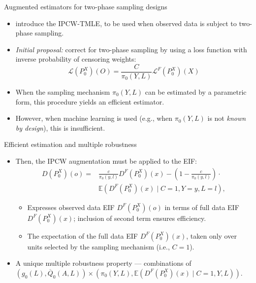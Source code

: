 \documentclass{beamer}
\newcommand{\E}{\mathbb{E}}
\newcommand{\lik}{\mathcal{L}}
\begin{document}

\begin{frame}[c]{Augmented estimators for two-phase sampling designs}

\begin{center}
\begin{itemize}
  \itemsep10pt
  \item \cite{rose2011targeted2sd} introduce the IPCW-TMLE, to be used when
    observed data is subject to two-phase sampling.
  \item \textit{Initial proposal:} correct for two-phase sampling by using a
    loss function with inverse probability of censoring weights:
    \begin{equation*}
      \lik(P_0^X)(O) = \frac{C}{\pi_0(Y, L)}\lik^F(P_0^X)(X)
    \end{equation*}
  \item When the sampling mechanism $\pi_0(Y,L)$ can be estimated by
    a parametric form, this procedure yields an efficient estimator.
  \item However, when machine learning is used (e.g., when $\pi_0(Y,L)$ is not
    \textit{known by design}), this is insufficient.
\end{itemize}
\end{center}

\note{
}

\end{frame}


\begin{frame}[c]{Efficient estimation and multiple robustness}

\begin{center}
\begin{itemize}
  \itemsep10pt
  \item Then, the IPCW augmentation must be applied to the EIF:
    \begin{align*}
      D(P_0^X)(o) = &\frac{c}{\pi_0(y, l)} D^F(P_0^X)(x) - \left(1 -
        \frac{c}{\pi_0(y, l)}\right) \cdot \\ &\E(D^F(P_0^X)(x) \mid
        C = 1, Y = y, L = l),
    \end{align*}
   \begin{itemize}
    \itemsep6pt
     \item Expresses observed data EIF $D^F(P_0^X)(o)$ in terms of full data
       EIF $D^F(P_0^X)(x)$; inclusion of second term ensures efficiency.
     \item The expectation of the full data EIF $D^F(P_0^X)(x)$, taken only over
      units selected by the sampling mechanism (i.e., $C = 1$).
  \end{itemize}
 \item A unique multiple robustness property --- combinations of
    $(g_0(L), \overline{Q}_0(A,L)) \times (\pi_0(Y, L), \E(D^F(P^X_0)(x) \mid
    C = 1, Y, L))$.
\end{itemize}
\end{center}

\note{
}

\end{frame}
\end{document}
